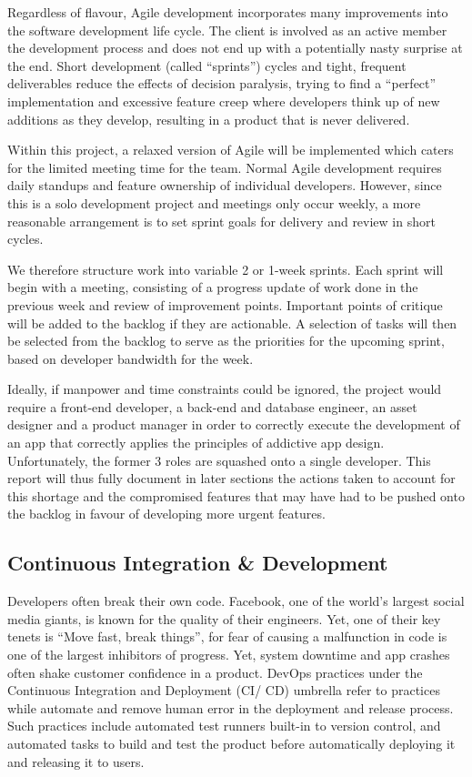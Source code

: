 Regardless of flavour, Agile development incorporates many improvements into the software development life cycle. The client is involved as an active member the development process and does not end up with a potentially nasty surprise at the end. Short development (called ``sprints'') cycles and tight, frequent deliverables reduce the effects of decision paralysis, trying to find a ``perfect'' implementation and excessive feature creep where developers think up of new additions as they develop, resulting in a product that is never delivered.

Within this project, a relaxed version of Agile will be implemented which caters for the limited meeting time for the team. Normal Agile development requires daily standups and feature ownership of individual developers. However, since this is a solo development project and meetings only occur weekly, a more reasonable arrangement is to set sprint goals for delivery and review in short cycles.

We therefore structure work into variable 2 or 1-week sprints. Each sprint will begin with a meeting, consisting of a progress update of work done in the previous week and review of improvement points. Important points of critique will be added to the backlog if they are actionable. A selection of tasks will then be selected from the backlog to serve as the priorities for the upcoming sprint, based on developer bandwidth for the week.

Ideally, if manpower and time constraints could be ignored, the project would require a front-end developer, a back-end and database engineer, an asset designer and a product manager in order to correctly execute the development of an app that correctly applies the principles of addictive app design. Unfortunately, the former 3 roles are squashed onto a single developer. This report will thus fully document in later sections the actions taken to account for this shortage and the compromised features that may have had to be pushed onto the backlog in favour of developing more urgent features.

\subsection{Continuous Integration \& Development}
Developers often break their own code. Facebook, one of the world's largest social media giants, is known for the quality of their engineers. Yet, one of their key tenets is ``Move fast, break things'', for fear of causing a malfunction in code is one of the largest inhibitors of progress. Yet, system downtime and app crashes often shake customer confidence in a product. DevOps practices under the Continuous Integration and Deployment (CI/ CD) umbrella refer to practices while automate and remove human error in the deployment and release process. Such practices include automated test runners built-in to version control, and automated tasks to build and test the product before automatically deploying it and releasing it to users.

